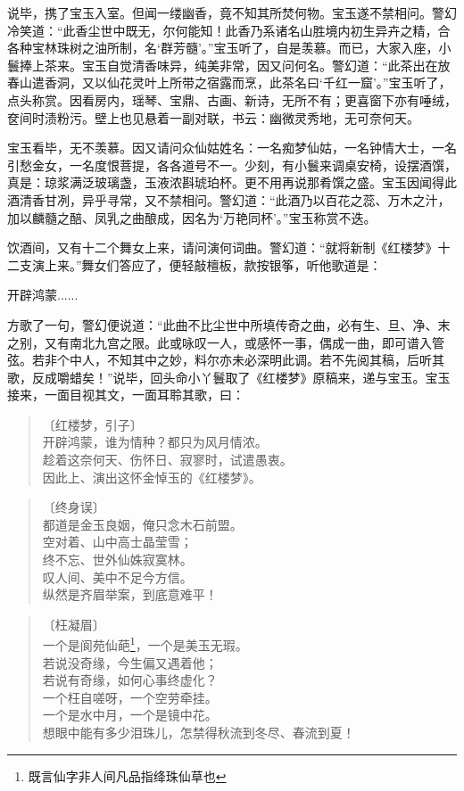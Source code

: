 \documentclass[12pt,oneside]{book}
\newenvironment{shici}{%
\begin{verse}%
\centering\large\hspace{12pt}}%
{\end{verse}}
\begin{document}
说毕，携了宝玉入室。但闻一缕幽香，竟不知其所焚何物。宝玉遂不禁相问。警幻冷笑道：“此香尘世中既无，尔何能知！此香乃系诸名山胜境内初生异卉之精，合各种宝林珠树之油所制，名‘群芳髓’。”宝玉听了，自是羡慕。而已，大家入座，小鬟捧上茶来。宝玉自觉清香味异，纯美非常，因又问何名。警幻道：“此茶出在放春山遣香洞，又以仙花灵叶上所带之宿露而烹，此茶名曰‘千红一窟’。”宝玉听了，点头称赏。因看房内，瑶琴、宝鼎、古画、新诗，无所不有；更喜窗下亦有唾绒，奁间时渍粉污。壁上也见悬着一副对联，书云：幽微灵秀地，无可奈何天。

宝玉看毕，无不羡慕。因又请问众仙姑姓名：一名痴梦仙姑，一名钟情大士，一名引愁金女，一名度恨菩提，各各道号不一。少刻，有小鬟来调桌安椅，设摆酒馔，真是：琼浆满泛玻璃盏，玉液浓斟琥珀杯。更不用再说那肴馔之盛。宝玉因闻得此酒清香甘冽，异乎寻常，又不禁相问。警幻道：“此酒乃以百花之蕊、万木之汁，加以麟髓之醅、凤乳之曲酿成，因名为‘万艳同杯’。”宝玉称赏不迭。

饮酒间，又有十二个舞女上来，请问演何词曲。警幻道：“就将新制《红楼梦》十二支演上来。”舞女们答应了，便轻敲檀板，款按银筝，听他歌道是：

开辟鸿蒙......

方歌了一句，警幻便说道：“此曲不比尘世中所填传奇之曲，必有生、旦、净、末之别，又有南北九宫之限。此或咏叹一人，或感怀一事，偶成一曲，即可谱入管弦。若非个中人，不知其中之妙，料尔亦未必深明此调。若不先阅其稿，后听其歌，反成嚼蜡矣！”说毕，回头命小丫鬟取了《红楼梦》原稿来，递与宝玉。宝玉接来，一面目视其文，一面耳聆其歌，曰：

\begin{shici}
〔红楼梦，引子〕\\
开辟鸿蒙，谁为情种？都只为风月情浓。\\
趁着这奈何天、伤怀日、寂寥时，试遣愚衷。\\
因此上、演出这怀金悼玉的《红楼梦》。
\end{shici}

\begin{shici}
〔终身误〕\\
都道是金玉良姻，俺只念木石前盟。\\
空对着、山中高士晶莹雪；\\
终不忘、世外仙姝寂寞林。\\
叹人间、美中不足今方信。\\
纵然是齐眉举案，到底意难平！
\end{shici}

\begin{shici}
〔枉凝眉〕\\
一个是阆苑仙葩\footnote{既言仙字非人间凡品指绛珠仙草也}，一个是美玉无瑕。\\
若说没奇缘，今生偏又遇着他；\\
若说有奇缘，如何心事终虚化？\\
一个枉自嗟呀，一个空劳牵挂。\\
一个是水中月，一个是镜中花。\\
想眼中能有多少泪珠儿，怎禁得秋流到冬尽、春流到夏！
\end{shici}
\end{document}
